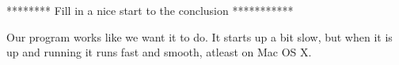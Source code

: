 ******** Fill in a nice start to the conclusion ***********

Our program works like we want it to do. It starts up a bit slow, but when it is up and running it runs fast and smooth, atleast on Mac OS X.
